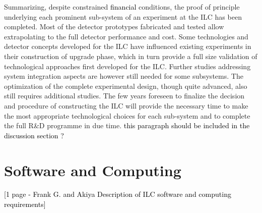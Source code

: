 \documentclass[%
 reprint,
 amsmath,amssymb,
 aps,
]{revtex4-1}
\newcommand{\jim}[1]{\textcolor{black}{#1}}
\newcommand{\todo}[1]{\textcolor{black}{{#1}}}
\begin{document}
Summarizing, despite constrained \jim{financial} conditions, the proof of principle underlying each prominent sub-system of an experiment at the ILC has been completed. Most of the detector prototypes fabricated and tested allow extrapolating to the full detector performance and cost. Some technologies and detector concepts developed for the ILC have influenced existing experiments in their construction of upgrade phase, which in turn provide a full size validation of technological approaches ﬁrst developed for the ILC. Further studies addressing system integration aspects are however still needed for some subsystems. The optimization of the complete experimental design, though quite advanced, also still requires additional studies. The few years foreseen to finalize the decision and procedure of constructing the ILC will provide the necessary time to make the most appropriate technological choices for each sub-system and to complete the full R\&D programme in due time. \todo{this paragraph should be included in the discussion section ?}



\section{\label{sec:soft}Software and Computing}

\todo{ [1 page - Frank G. and Akiya
Description of ILC software and computing requirements] }
\end{document}
